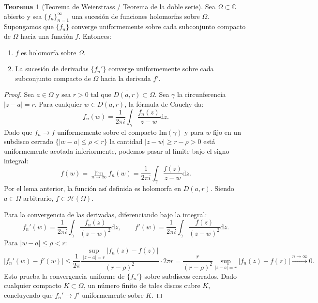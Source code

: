 \documentclass[11pt,a4paper]{article}
\theoremstyle{definition}
\newtheorem{teorema}{Teorema}[section]
\theoremstyle{remark}
\numberwithin{equation}{section}
\newcommand{\dz}{\mathrm{d}z}
\begin{document}
\begin{teorema}[Teorema de Weierstrass / Teorema de la doble serie]
Sea $\Omega \subset \mathbb{C}$ abierto y sea $\{f_n\}_{n=1}^\infty$ una sucesión de funciones holomorfas sobre $\Omega$. Supongamos que $\{f_n\}$ converge uniformemente sobre cada subconjunto compacto de $\Omega$ hacia una función $f$. Entonces:
\begin{enumerate}
\item $f$ es holomorfa sobre $\Omega$.
\item La sucesión de derivadas $\{f_n'\}$ converge uniformemente sobre cada subconjunto compacto de $\Omega$ hacia la derivada $f'$.
\end{enumerate}
\end{teorema}
\begin{proof}
Sea $a \in \Omega$ y sea $r > 0$ tal que $\overline{D(a,r)} \subset \Omega$. Sea $\gamma$ la circunferencia $|z-a|=r$. Para cualquier $w \in D(a,r)$, la fórmula de Cauchy da:
\[
f_n(w) = \frac{1}{2\pi i} \int_\gamma \frac{f_n(z)}{z-w} \dz.
\]
Dado que $f_n \to f$ uniformemente sobre el compacto $\mathrm{Im}(\gamma)$ y para $w$ fijo en un subdisco cerrado $\{|w-a| \le \rho < r\}$ la cantidad $|z-w| \ge r - \rho > 0$ está uniformemente acotada inferiormente, podemos pasar al límite bajo el signo integral:
\[
f(w) = \lim_{n \to \infty} f_n(w) = \frac{1}{2\pi i} \int_\gamma \frac{f(z)}{z-w} \dz.
\]
Por el lema anterior, la función así definida es holomorfa en $D(a,r)$. Siendo $a \in \Omega$ arbitrario, $f \in \mathcal{H}(\Omega)$.

Para la convergencia de las derivadas, diferenciando bajo la integral:
\[
f_n'(w) = \frac{1}{2\pi i} \int_\gamma \frac{f_n(z)}{(z-w)^2} \dz, \qquad f'(w) = \frac{1}{2\pi i} \int_\gamma \frac{f(z)}{(z-w)^2} \dz.
\]
Para $|w-a| \le \rho < r$:
\[
|f_n'(w) - f'(w)| \le \frac{1}{2\pi} \frac{\sup_{|z-a|=r} |f_n(z) - f(z)|}{(r-\rho)^2} \cdot 2\pi r = \frac{r}{(r-\rho)^2} \sup_{|z-a|=r} |f_n(z) - f(z)| \xrightarrow{n \to \infty} 0.
\]
Esto prueba la convergencia uniforme de $\{f_n'\}$ sobre subdiscos cerrados. Dado cualquier compacto $K \subset \Omega$, un número finito de tales discos cubre $K$, concluyendo que $f_n' \to f'$ uniformemente sobre $K$.
\end{proof}
\end{document}

